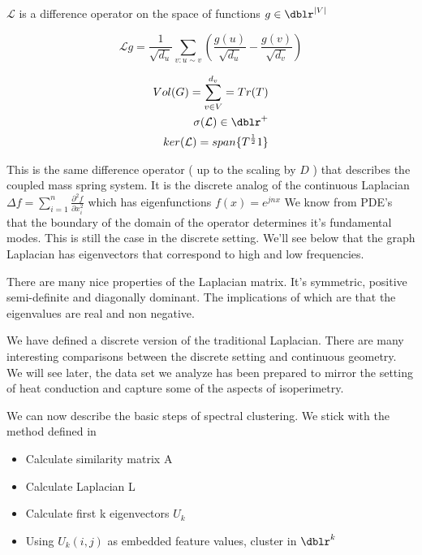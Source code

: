 $\mathcal{L}$ is a difference operator on the space of functions $g \in \dblr^{|V|}$

\begin{equation*}
 \mathcal{L} g  = \frac{1}{\sqrt{d_u}} \sum\limits_{v : u \sim v} ( \frac{g(u)}{\sqrt{d_u}} -  \frac{g(v)}{\sqrt{d_v} } )
\end{equation*}

\begin{eqnarray}
Vol (G) = \sum\limits_{v \in V}^{d_v} = Tr(T) \\
\sigma(\mathcal{L}) \in \dblr^+ \\
ker ( \mathcal{L} ) = span\{ T^{\frac{1}{2}} 1 \}
\end{eqnarray}

This is the same difference operator ( up to the scaling by $D$ ) that describes the coupled mass spring system.  It is the discrete analog of the continuous Laplacian $\Delta f=\sum_{i=1}^n \frac{\partial^2 f}{\partial x_i^2}$ which has eigenfunctions $f(x)=e^{j n x}$ We know from PDE's that the boundary of the domain of the operator determines it's fundamental modes.  This is still the case in the discrete setting. We'll see below that the graph Laplacian has eigenvectors that correspond to high and low frequencies. 

There are many nice properties of the Laplacian matrix. It's symmetric, positive semi-definite and diagonally dominant. The implications of which are that the eigenvalues are real and non negative. 

We have defined a discrete version of the traditional Laplacian.  There are many interesting comparisons between the discrete setting and continuous geometry. We will see later, the data set we analyze has been prepared to mirror the setting of heat conduction and capture some of the aspects of isoperimetry.

We can now describe the basic steps of spectral clustering.  We stick with the method defined in \cite{NIPS2001_801272ee}

\begin{itemize}
\setlength\itemsep{-0.5em}
    \item Calculate similarity matrix A
    \item Calculate Laplacian L
    \item Calculate first k eigenvectors $U_k$
    \item Using $U_k(i,j)$ as embedded feature values, cluster in $\dblr^k$
\end{itemize}

